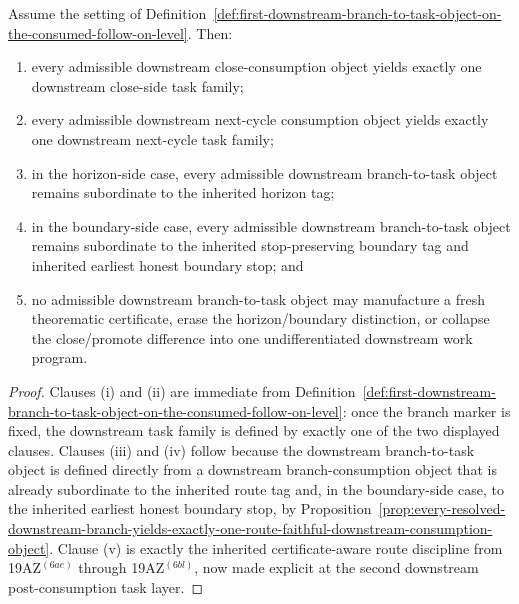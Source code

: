 \begin{proposition}
\label{prop:every-consumed-downstream-branch-yields-exactly-one-route-faithful-downstream-task-family}
Assume the setting of Definition~\ref{def:first-downstream-branch-to-task-object-on-the-consumed-follow-on-level}. Then:
\begin{enumerate}[label=(\roman*)]
  \item every admissible downstream close-consumption object yields exactly one downstream close-side task family;
  \item every admissible downstream next-cycle consumption object yields exactly one downstream next-cycle task family;
  \item in the horizon-side case, every admissible downstream branch-to-task object remains subordinate to the inherited horizon tag;
  \item in the boundary-side case, every admissible downstream branch-to-task object remains subordinate to the inherited stop-preserving boundary tag and inherited earliest honest boundary stop; and
  \item no admissible downstream branch-to-task object may manufacture a fresh theorematic certificate, erase the horizon/boundary distinction, or collapse the close/promote difference into one undifferentiated downstream work program.
\end{enumerate}
\end{proposition}

\begin{proof}
Clauses (i) and (ii) are immediate from Definition~\ref{def:first-downstream-branch-to-task-object-on-the-consumed-follow-on-level}: once the branch marker is fixed, the downstream task family is defined by exactly one of the two displayed clauses. Clauses (iii) and (iv) follow because the downstream branch-to-task object is defined directly from a downstream branch-consumption object that is already subordinate to the inherited route tag and, in the boundary-side case, to the inherited earliest honest boundary stop, by Proposition~\ref{prop:every-resolved-downstream-branch-yields-exactly-one-route-faithful-downstream-consumption-object}. Clause (v) is exactly the inherited certificate-aware route discipline from 19AZ$^{(6ae)}$ through 19AZ$^{(6bl)}$, now made explicit at the second downstream post-consumption task layer.
\end{proof}

